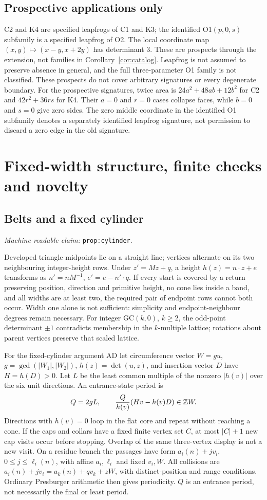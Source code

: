 \documentclass[11pt]{amsart}
\newcommand{\Z}{\mathbb Z}
\newcommand{\record}[1]{\nolinkurl{#1}}
\newcommand{\claimid}[1]{\par\nopagebreak\noindent\textit{Machine-readable claim:} \record{#1}.\par}
\theoremstyle{definition}\newtheorem{definition}{Definition}
\begin{document}
\subsection{Prospective applications only}
C2 and K4 are specified leapfrogs of C1 and K3; the identified O1$(p,0,s)$
subfamily is a specified leapfrog of O2. The local coordinate map
$(x,y)\mapsto(x-y,x+2y)$ has determinant 3. These are prospects through
the extension, not families in Corollary~\ref{cor:catalog}. Leapfrog
is not assumed to preserve absence in general, and the full
three-parameter O1 family is not classified. These prospects do not
cover arbitrary signatures or every degenerate boundary. For the prospective signatures, twice area is $24a^2+48ab+12b^2$ for C2 and $42r^2+36rs$ for K4. Their $a=0$ and $r=0$ cases collapse faces, while $b=0$ and $s=0$ give zero sides. The zero middle coordinate in the identified O1 subfamily denotes a separately identified leapfrog signature, not permission to discard a zero edge in the old signature.

\section{Fixed-width structure, finite checks and novelty}\label{sec:evidence}
\subsection{Belts and a fixed cylinder}\label{prop:cylinder}
\claimid{prop:cylinder}
Developed triangle midpoints lie on a straight line; vertices alternate
on its two neighbouring integer-height rows. Under $z'=Mz+q$, a height
$h(z)=n\cdot z+e$ transforms as $n'=nM^{-1}$,
$e'=e-n'\cdot q$. If every start is covered by a return preserving
position, direction and primitive height, no cone lies inside a band,
and all widths are at least two, the required pair of endpoint rows
cannot both occur. Width one alone is not sufficient: simplicity and
endpoint-neighbour degrees remain necessary. For integer GC$(k,0)$,
$k\ge2$, the odd-point determinant $\pm1$ contradicts membership in
the $k$-multiple lattice; rotations about parent vertices preserve that
scaled lattice.

For the fixed-cylinder argument AD let circumference vector $W=gu$,
$g=\gcd(|W_1|,|W_2|)$, $h(z)=\det(u,z)$, and insertion vector $D$
have $H=h(D)>0$. Let $L$ be the least common multiple of the nonzero
$|h(v)|$ over the six unit directions. An entrance-state period is
\begin{equation}\label{eq:cylinder}
 Q=2gL,\qquad {Q\over h(v)}(Hv-h(v)D)\in\Z W.
\end{equation}
Directions with $h(v)=0$ loop in the flat core and repeat without
reaching a cone. If the caps and collars have a fixed finite vertex
set $C$, at most $|C|+1$ new cap visits occur before stopping. Overlap
of the same three-vertex display is not a new visit. On a residue
branch the passages have form $a_i(n)+jv_i$, $0\le j\le\ell_i(n)$,
with affine $a_i,\ell_i$ and fixed $v_i,W$. All collisions are
$a_i(n)+jv_i=a_k(n)+qv_k+zW$, with distinct-position and range
conditions. Ordinary Presburger arithmetic then gives periodicity.
$Q$ is an entrance period, not necessarily the final or least period.
\end{document}
